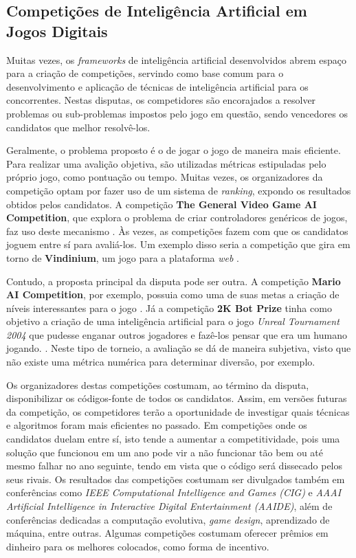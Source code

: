 \subsection{Competições de Inteligência Artificial em Jogos Digitais}
Muitas vezes, os \textit{frameworks} de inteligência artificial desenvolvidos
abrem espaço para a criação de competições, servindo como base comum para o
desenvolvimento e aplicação de técnicas de inteligência artificial para os
concorrentes. Nestas disputas, os competidores são encorajados a resolver
problemas ou sub-problemas impostos pelo jogo em questão, sendo vencedores os
candidatos que melhor resolvê-los.

Geralmente, o problema proposto é o de jogar o jogo de maneira mais eficiente.
Para realizar uma avalição objetiva, são utilizadas métricas estipuladas pelo
próprio jogo, como pontuação ou tempo. Muitas vezes, os organizadores da
competição optam por fazer uso de um sistema de \textit{ranking}, expondo os
resultados obtidos pelos candidatos. A competição \textbf{The General Video Game
AI Competition}, que explora o problema de criar controladores genéricos de
jogos, faz uso deste mecanismo \cite{GVGAIWEB}.  Às vezes, as competições fazem
com que os candidatos joguem entre sí para avaliá-los.  Um exemplo disso seria a
competição que gira em torno de \textbf{Vindinium}, um jogo para a plataforma
\textit{web} \cite{VINDINIUMWEB}.

Contudo, a proposta principal da disputa pode ser outra. A competição
\textbf{Mario AI Competition}, por exemplo, possuia como uma de suas metas a
criação de níveis interessantes para o jogo \cite{MARIOAIWEB}. Já a competição
\textbf{2K Bot Prize} tinha como objetivo a criação de uma inteligência
artificial para o jogo \textit{Unreal Tournament 2004} que pudesse enganar
outros jogadores e fazê-los pensar que era um humano jogando.
\cite{UNREALAIWEB}. Neste tipo de torneio, a avaliação se dá de maneira
subjetiva, visto que não existe uma métrica numérica para determinar diversão,
por exemplo.

Os organizadores destas competições costumam, ao término da disputa,
disponibilizar os códigos-fonte de todos os candidatos. Assim, em versões
futuras da competição, os competidores terão a oportunidade de investigar quais
técnicas e algoritmos foram mais eficientes no passado. Em competições onde os
candidatos duelam entre sí, isto tende a aumentar a competitividade, pois uma
solução que funcionou em um ano pode vir a não funcionar tão bem ou até mesmo
falhar no ano seguinte, tendo em vista que o código será dissecado pelos seus
rivais. Os resultados das competições costumam ser divulgados também em
conferências como \textit{IEEE Computational Intelligence and Games (CIG)} e
\textit{AAAI Artificial Intelligence in Interactive Digital Entertainment
(AAIDE)}, além de conferências dedicadas a computação evolutiva, \textit{game
design}, aprendizado de máquina, entre outras. Algumas competições costumam
oferecer prêmios em dinheiro para os melhores colocados, como forma de
incentivo.


